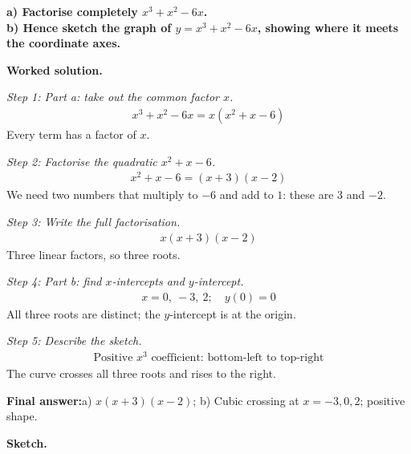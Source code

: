 \documentclass[11pt]{article}
\newcommand{\question}[1]{\par\medskip\noindent\textbf{#1}\par}
\begin{document}
\question{a) Factorise completely \( x^3 + x^2 - 6x \). \\[3pt] b) Hence sketch the graph of \( y = x^3 + x^2 - 6x \), showing where it meets the coordinate axes.}

\textbf{Worked solution.}

\textit{Step 1: Part a: take out the common factor \( x \).}
\[\begin{gathered}
x^3 + x^2 - 6x = x(x^2 + x - 6)
\end{gathered}\]
Every term has a factor of \( x \).

\textit{Step 2: Factorise the quadratic \( x^2 + x - 6 \).}
\[\begin{gathered}
x^2 + x - 6 = (x + 3)(x - 2)
\end{gathered}\]
We need two numbers that multiply to \(-6\) and add to \(1\): these are \(3\) and \(-2\).

\textit{Step 3: Write the full factorisation.}
\[\begin{gathered}
x(x + 3)(x - 2)
\end{gathered}\]
Three linear factors, so three roots.

\textit{Step 4: Part b: find \( x \)-intercepts and \( y \)-intercept.}
\[\begin{gathered}
x = 0,\ -3,\ 2; \quad y(0) = 0
\end{gathered}\]
All three roots are distinct; the \( y \)-intercept is at the origin.

\textit{Step 5: Describe the sketch.}
\[\begin{gathered}
\text{Positive }x^3\text{ coefficient: bottom-left to top-right}
\end{gathered}\]
The curve crosses all three roots and rises to the right.

\begin{answerbox}
\textbf{Final answer:}\quad a) \(\displaystyle x(x+3)(x-2)\); b) Cubic crossing at \(\displaystyle x = -3, 0, 2\); positive shape.
\end{answerbox}
\textbf{Sketch.}
\end{document}
